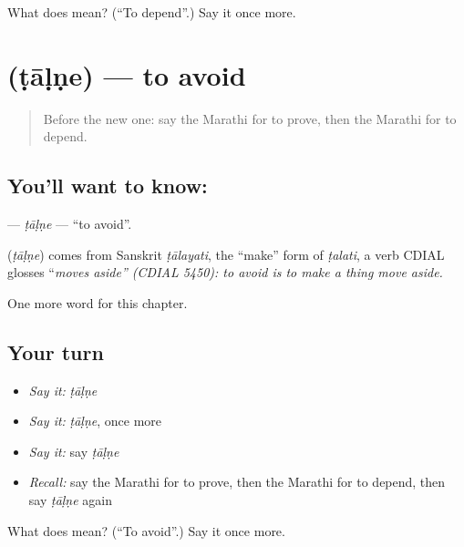 \begin{tcolorbox}[breakable,colback=teal!4,colframe=teal!35!black,title={Before you move on}]
What does   mean? (\textquotedblleft{}To depend\textquotedblright{}.) Say it once more.
\end{tcolorbox}
\section[\texorpdfstring{\mr{टाळणे} (ṭāḷṇe)}{टाळणे (ṭāḷṇe)}]{ (ṭāḷṇe) — to avoid}

\label{lesson:MR-C225-talne}



\begin{quote}
Before the new one: say the Marathi for to prove, then the Marathi for to depend.
\end{quote}

\subsection*{You'll want to know: }
\textbf{} — \emph{ṭāḷṇe} — \textquotedblleft{}to avoid\textquotedblright{}.

\begin{cousinweb}
\textbf{} (\emph{ṭāḷṇe}) comes from Sanskrit \emph{ṭālayati}, the \textquotedblleft{}make\textquotedblright{} form of \emph{ṭalati}, a verb CDIAL glosses \textquotedblleft{}\emph{moves aside\textquotedblright{} (CDIAL 5450): to avoid is to make a thing move aside.}
\end{cousinweb}

\begin{grammarlens}[title={What you've built}]
One more word for this chapter.
\end{grammarlens}

\subsection*{Your turn}
\begin{itemize}
\raggedright
  \item \emph{Say it:} \emph{ṭāḷṇe}
  \item \emph{Say it:} \emph{ṭāḷṇe}, once more
  \item \emph{Say it:} say \emph{ṭāḷṇe}
  \item \emph{Recall:} say the Marathi for to prove, then the Marathi for to depend, then say \emph{ṭāḷṇe} again
\end{itemize}

\begin{tcolorbox}[breakable,colback=teal!4,colframe=teal!35!black,title={Before you move on}]
What does  mean? (\textquotedblleft{}To avoid\textquotedblright{}.) Say it once more.
\end{tcolorbox}
